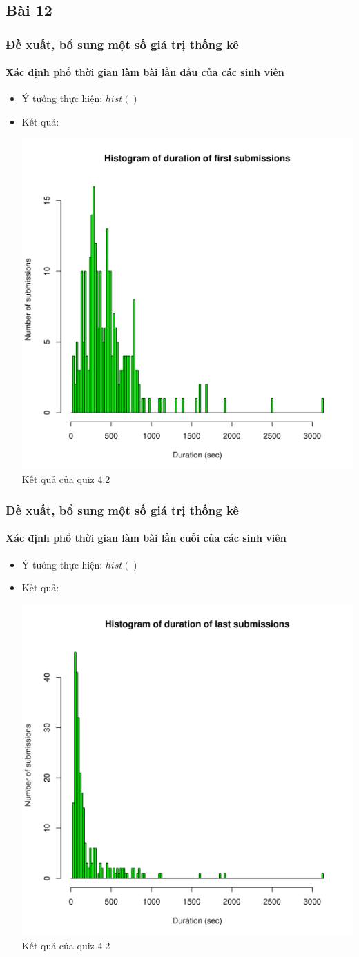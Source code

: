 \documentclass[english,10pt,table]{beamer}
\begin{document}
\subsection{Bài 12}

\frame
{
\frametitle{Đề xuất, bổ sung một số giá trị thống kê}
\framesubtitle{Xác định phổ thời gian làm bài lần đầu của các sinh viên}
\begin{itemize}
    \item Ý tưởng thực hiện: $hist()$
    \item Kết quả:\\
    \begin{center}
        \includegraphics[width = 6 cm]{Images/img12-2-4.png}\\
        Kết quả của quiz 4.2
    \end{center}
\end{itemize}
}

\frame
{
\frametitle{Đề xuất, bổ sung một số giá trị thống kê}
\framesubtitle{Xác định phổ thời gian làm bài lần cuối của các sinh viên}
\begin{itemize}
    \item Ý tưởng thực hiện: $hist()$
    \item Kết quả:\\
    \begin{center}
        \includegraphics[width = 6 cm]{Images/img12-3-4.png}\\
        Kết quả của quiz 4.2
    \end{center}
\end{itemize}
}
\end{document}
